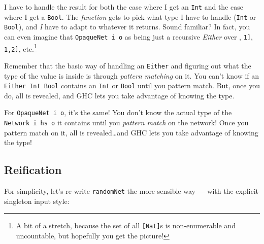 \documentclass[]{article}
\newenvironment{Shaded}{}{}
\newcommand{\KeywordTok}[1]{\textcolor[rgb]{0.00,0.44,0.13}{\textbf{{#1}}}}
\newcommand{\DataTypeTok}[1]{\textcolor[rgb]{0.56,0.13,0.00}{{#1}}}
\newcommand{\CommentTok}[1]{\textcolor[rgb]{0.38,0.63,0.69}{\textit{{#1}}}}
\newcommand{\OtherTok}[1]{\textcolor[rgb]{0.00,0.44,0.13}{{#1}}}
\newcommand{\FunctionTok}[1]{\textcolor[rgb]{0.02,0.16,0.49}{{#1}}}
\newcommand{\NormalTok}[1]{{#1}}
\begin{document}
I have to handle the result for both the case where I get an \texttt{Int} and
the case where I get a \texttt{Bool}. The \emph{function} gets to pick what type
I have to handle (\texttt{Int} or \texttt{Bool}), and \emph{I} have to adapt to
whatever it returns. Sound familiar? In fact, you can even imagine that
\texttt{OpaqueNet\ i\ o} as being just a recursive \emph{Either} over
\texttt{\textquotesingle{}{[}{]}}, \texttt{\textquotesingle{}{[}1{]}},
\texttt{\textquotesingle{}{[}1,2{]}}, etc.\footnote{A bit of a stretch, because
  the set of all \texttt{{[}Nat{]}}s is non-enumerable and uncountable, but
  hopefully you get the picture!}

Remember that the basic way of handling an \texttt{Either} and figuring out what
the type of the value is inside is through \emph{pattern matching} on it. You
can't know if an \texttt{Either\ Int\ Bool} contains an \texttt{Int} or
\texttt{Bool} until you pattern match. But, once you do, all is revealed, and
GHC lets you take advantage of knowing the type.

For \texttt{OpaqueNet\ i\ o}, it's the same! You don't know the actual type of
the \texttt{Network\ i\ hs\ o} it contains until you \emph{pattern match} on the
network! Once you pattern match on it, all is revealed\ldots{}and GHC lets you
take advantage of knowing the type!

\subsection{Reification}\label{reification}

For simplicity, let's re-write \texttt{randomNet} the more sensible way --- with
the explicit singleton input style:

\begin{Shaded}
\end{Shaded}
\end{document}
